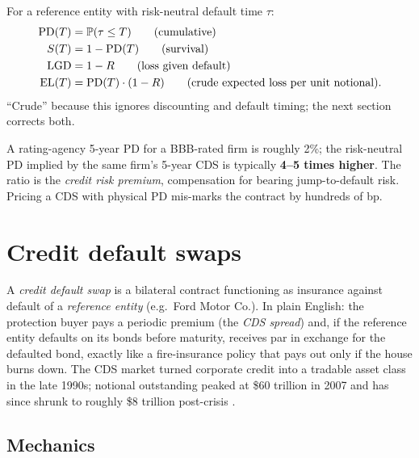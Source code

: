 \begin{keyfactbox}
For a reference entity with risk-neutral default time $\tau$:
\begin{align*}
  \mathrm{PD}(T) &= \mathbb{P}(\tau \le T) \qquad \text{(cumulative)}\\
  S(T) &= 1 - \mathrm{PD}(T) \qquad \text{(survival)}\\
  \mathrm{LGD} &= 1 - R \qquad \text{(loss given default)}\\
  \mathrm{EL}(T) &= \mathrm{PD}(T) \cdot (1 - R)
    \qquad \text{(crude expected loss per unit notional).}
\end{align*}
``Crude'' because this ignores discounting and default timing; the
next section corrects both.
\end{keyfactbox}

\begin{pitfallbox}
A rating-agency 5-year PD for a BBB-rated firm is roughly 2\%; the
risk-neutral PD implied by the same firm's 5-year CDS is typically
\textbf{4--5 times higher}.  The ratio is the \emph{credit risk
premium}, compensation for bearing jump-to-default risk.  Pricing
a CDS with physical PD mis-marks the contract by hundreds of bp.
\end{pitfallbox}


\section{Credit default swaps}
\label{sec:cds}

A \emph{credit default swap} is a bilateral contract functioning as
insurance against default of a \emph{reference entity} (e.g.\ Ford
Motor Co.).  In plain English: the protection buyer pays a periodic
premium (the \emph{CDS spread}) and, if the reference entity
defaults on its bonds before maturity, receives par in exchange for
the defaulted bond, exactly like a fire-insurance policy that
pays out only if the house burns down.
The CDS market turned corporate credit into a tradable
asset class in the late 1990s; notional outstanding peaked at \$60
trillion in 2007 and has since shrunk to roughly \$8 trillion
post-crisis \citeHull.

\subsection{Mechanics}

